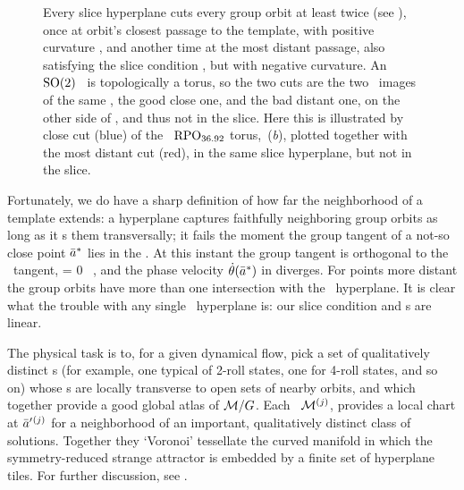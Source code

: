 \documentclass{jfm}
\begin{document}
\begin{figure}
   \centering
   \caption{\label{fig:sliceimage}
      Every slice hyperplane cuts every group orbit at least twice (see
      ), once at       orbit's closest passage to the
      template, with positive curvature ,   and another
      time at the most distant passage, also satisfying the slice
      condition , but with negative curvature. An
      $\textrm{SO}(2)$ \rpo\ is topologically a torus, so the two cuts are the
      two \po\ images of the same \rpo, the good close one, and the bad
      distant one, on the other side of {\sset}, and thus not in the
      slice. Here this is illustrated by close cut (blue) of the \rpo\
      $\mathrm{RPO}_{36.92}$ torus, \,({\it b}),
      plotted together with the most distant cut (red), in the same slice
      hyperplane, but not in the slice.
   }
\end{figure}


Fortunately, we do have a sharp definition of how far the neighborhood
of a template extends:
a hyperplane captures faithfully neighboring group orbits as long
as it \slice s them transversally; it fails the moment the group tangent of
a not-so close point $\bar{a}^*$ lies in the \slice.
At this instant the group tangent is orthogonal to the \slice\ tangent,
\beq
\braket{\groupTan(\sspRSing)}{\sliceTan{}}= 0
\, ,
%
and the phase velocity $\dot{{\bf \theta}}(\bar{a}^*)$ in 
diverges.  For points more distant the group orbits have more than one
intersection with the \slice\ hyperplane. It is clear what the trouble
with any single \slice\ hyperplane is: our slice condition and \slice s
are linear.

The physical task is to, for a given dynamical flow, pick a set of
qualitatively distinct {\template s} (for example, one typical of 2-roll
states, one for 4-roll states, and so on) whose \slice s  are locally
transverse to open sets of nearby orbits, and which together provide a
good global atlas of $\pS/\Group$. Each \slice\ $\pS{}^{(j)}$, provides a
local chart at $\bar{a}'{}^{(j)}$ for a neighborhood of an important,
qualitatively distinct class of solutions. Together they `Voronoi'
tessellate  the curved manifold in which the symmetry-reduced strange
attractor is embedded by a finite set of hyperplane tiles.
For further discussion, see .
\end{document}

